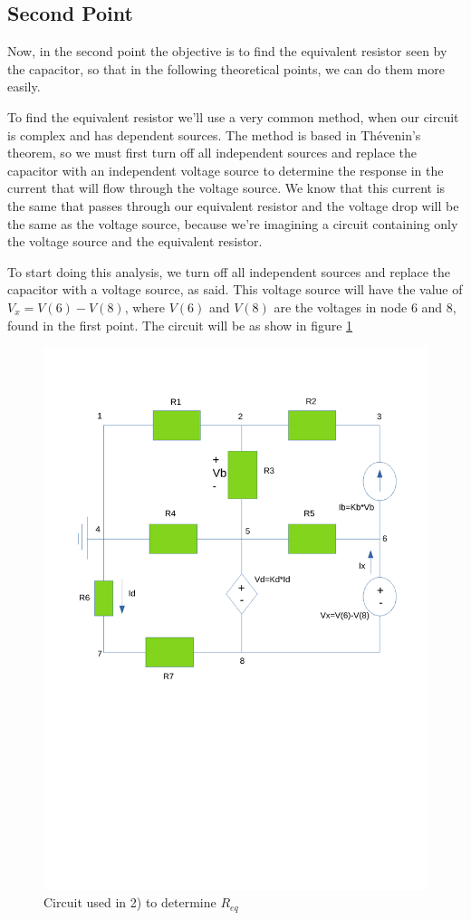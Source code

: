 \newpage

\subsection{Second Point}
\label{ssec:2T}

\noindent \par Now, in the second point the objective is to find the equivalent resistor seen by the capacitor, so that in the following theoretical points, we can do them more easily.
\par To find the equivalent resistor we'll use a very common method, when our circuit is complex and has dependent sources. The method is based in Thévenin's theorem, so we must first turn off all independent sources and replace the capacitor with an independent voltage source to determine the response in the current that will flow through the voltage source. We know that this current is the same that passes through our equivalent resistor and the voltage drop will be the same as the voltage source, because we're imagining a circuit containing only the voltage source and the equivalent resistor. 
\par To start doing this analysis, we turn off all independent sources and replace the capacitor with a voltage source, as said. This voltage source will have the value of $V_x=V(6)-V(8)$, where $V(6)$ and $V(8)$ are the voltages in node 6 and 8, found in the first point. The circuit will be as show in figure \ref{fig:Cir_2}

\begin{figure}[h!] \centering
\includegraphics[width=0.6\linewidth]{esquema.pdf}
\caption{Circuit used in 2) to determine $R_{eq}$}
\label{fig:Cir_2}
\end{figure}

